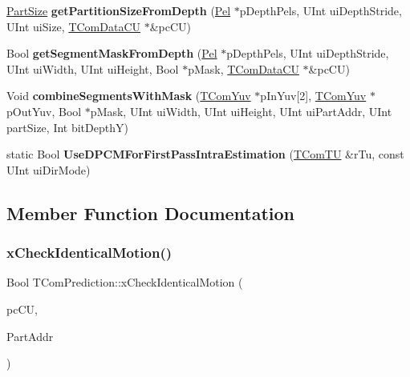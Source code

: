 \begin{DoxyCompactItemize}
\item 
\mbox{\label{class_t_com_prediction_a40faf6aca875f29838a0e772e8fe03af}} 
\hyperlink{_type_def_8h_a0093b7809f3cfae06fda9d67441267bd}{Part\+Size} {\bfseries get\+Partition\+Size\+From\+Depth} (\hyperlink{_type_def_8h_af92141699657699b4b547be0c8517541}{Pel} $\ast$p\+Depth\+Pels, U\+Int ui\+Depth\+Stride, U\+Int ui\+Size, \hyperlink{class_t_com_data_c_u}{T\+Com\+Data\+CU} $\ast$\&pc\+CU)
\item 
\mbox{\label{class_t_com_prediction_a7d113b4f4ef13002c64ca810f08f0515}} 
Bool {\bfseries get\+Segment\+Mask\+From\+Depth} (\hyperlink{_type_def_8h_af92141699657699b4b547be0c8517541}{Pel} $\ast$p\+Depth\+Pels, U\+Int ui\+Depth\+Stride, U\+Int ui\+Width, U\+Int ui\+Height, Bool $\ast$p\+Mask, \hyperlink{class_t_com_data_c_u}{T\+Com\+Data\+CU} $\ast$\&pc\+CU)
\item 
\mbox{\label{class_t_com_prediction_a26f3e29114f250d18e6300d6df5424c4}} 
Void {\bfseries combine\+Segments\+With\+Mask} (\hyperlink{class_t_com_yuv}{T\+Com\+Yuv} $\ast$p\+In\+Yuv\mbox{[}2\mbox{]}, \hyperlink{class_t_com_yuv}{T\+Com\+Yuv} $\ast$p\+Out\+Yuv, Bool $\ast$p\+Mask, U\+Int ui\+Width, U\+Int ui\+Height, U\+Int ui\+Part\+Addr, U\+Int part\+Size, Int bit\+DepthY)
\item 
\mbox{\label{class_t_com_prediction_a0141614dcf5d0becf3dbf16ff7bec3d6}} 
static Bool {\bfseries Use\+D\+P\+C\+M\+For\+First\+Pass\+Intra\+Estimation} (\hyperlink{class_t_com_t_u}{T\+Com\+TU} \&r\+Tu, const U\+Int ui\+Dir\+Mode)
\end{DoxyCompactItemize}


\subsection{Member Function Documentation}
\mbox{\label{class_t_com_prediction_ad9c1d83073b2ba0554d7ab9e8eafe7cf}} 
\subsubsection{\texorpdfstring{x\+Check\+Identical\+Motion()}{xCheckIdenticalMotion()}}
{\footnotesize\ttfamily Bool T\+Com\+Prediction\+::x\+Check\+Identical\+Motion (\begin{DoxyParamCaption}\item[{\hyperlink{class_t_com_data_c_u}{T\+Com\+Data\+CU} $\ast$}]{pc\+CU,  }\item[{U\+Int}]{Part\+Addr }\end{DoxyParamCaption})\hspace{0.3cm}{\ttfamily [protected]}}

